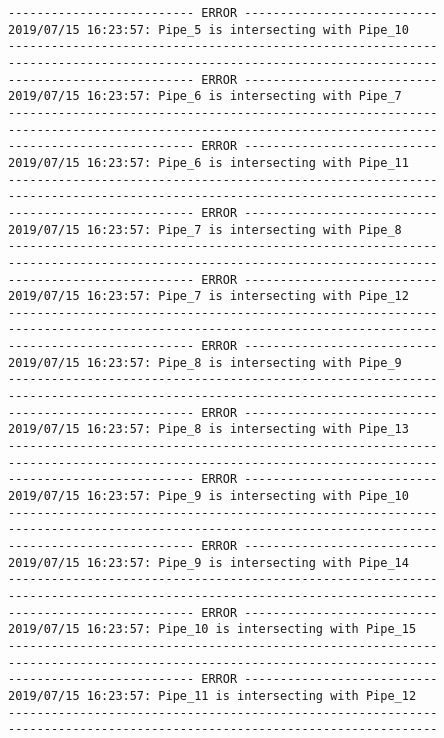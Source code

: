 \documentclass{article}
\begin{document}
{\begin{verbatim}
-------------------------- ERROR ---------------------------
2019/07/15 16:23:57: Pipe_5 is intersecting with Pipe_10
------------------------------------------------------------
------------------------------------------------------------
-------------------------- ERROR ---------------------------
2019/07/15 16:23:57: Pipe_6 is intersecting with Pipe_7
------------------------------------------------------------
------------------------------------------------------------
-------------------------- ERROR ---------------------------
2019/07/15 16:23:57: Pipe_6 is intersecting with Pipe_11
------------------------------------------------------------
------------------------------------------------------------
-------------------------- ERROR ---------------------------
2019/07/15 16:23:57: Pipe_7 is intersecting with Pipe_8
------------------------------------------------------------
------------------------------------------------------------
-------------------------- ERROR ---------------------------
2019/07/15 16:23:57: Pipe_7 is intersecting with Pipe_12
------------------------------------------------------------
------------------------------------------------------------
-------------------------- ERROR ---------------------------
2019/07/15 16:23:57: Pipe_8 is intersecting with Pipe_9
------------------------------------------------------------
------------------------------------------------------------
-------------------------- ERROR ---------------------------
2019/07/15 16:23:57: Pipe_8 is intersecting with Pipe_13
------------------------------------------------------------
------------------------------------------------------------
-------------------------- ERROR ---------------------------
2019/07/15 16:23:57: Pipe_9 is intersecting with Pipe_10
------------------------------------------------------------
------------------------------------------------------------
-------------------------- ERROR ---------------------------
2019/07/15 16:23:57: Pipe_9 is intersecting with Pipe_14
------------------------------------------------------------
------------------------------------------------------------
-------------------------- ERROR ---------------------------
2019/07/15 16:23:57: Pipe_10 is intersecting with Pipe_15
------------------------------------------------------------
------------------------------------------------------------
-------------------------- ERROR ---------------------------
2019/07/15 16:23:57: Pipe_11 is intersecting with Pipe_12
------------------------------------------------------------
------------------------------------------------------------

\end{verbatim}}
\end{document}
